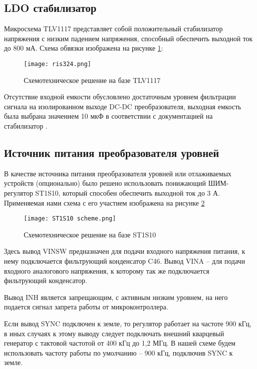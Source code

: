 \subsection{LDO стабилизатор}
\hspace{1cm}

Микросхема TLV1117 представляет собой положительный стабилизатор напряжения с низким падением напряжения, 
способный обеспечить выходной ток до 800 мА. Схема обвязки изображена на рисунке \ref{ris:324}: 

\begin{figure}[H]
    \centering
    \texttt{[image: ris324.png]}
    \caption{Схемотехническое решение на базе TLV1117}
    \label{ris:324}
\end{figure}

Отсутствие входной емкости обусловлено достаточным уровнем фильтрации сигнала на изолированном выходе 
DC-DC преобразователя, выходная емкость была выбрана значением 10 мкФ в соответствии с документацией 
на стабилизатор \cite{TLV1117:datasheet}. 

\subsection{Источник питания преобразователя уровней}
\hspace{1cm}

В качестве источника питания преобразователя уровней или отлаживаемых устройств (опционально) было решено 
использовать понижающий ШИМ-регулятор ST1S10, который способен обеспечить выходной ток до 3 А. 
Применяемая нами схема с его участием изображена на рисунке \ref{ris:ST1S10}

\begin{figure}[H]
    \centering
    \texttt{[image: ST1S10 scheme.png]}
    \caption{Схемотехническое решение на базе ST1S10}
    \label{ris:ST1S10}
\end{figure}

Здесь вывод VINSW предназначен для подачи входного напряжения питания, к нему подключается фильтрующий 
конденсатор C46. Вывод VINA -- для подачи входного аналогового напряжения, к которому так же подключается 
фильтрующий конденсатор. 

Вывод INH является запрещающим, с активным низким уровнем, на него подается сигнал запрета работы от 
микроконтроллера. 

Если вывод SYNC подключен к земле, то регулятор работает на частоте 900 кГц, в иных случаях к этому выводу 
следует подключать внешний кварцевый генератор с тактовой частотой от 400 кГц до 1,2 МГц. В нашей схеме 
будем использовать частоту работы по умолчанию -- 900 кГц, подключив SYNC к земле. 

